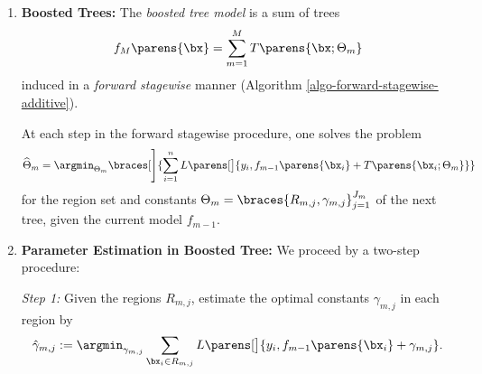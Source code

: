 \documentclass[12pt]{article}
\begin{document}
\begin{enumerate}[label=\textbf{\arabic*.}]
	\item \textbf{Boosted Trees:} The \textit{boosted tree model} is a sum of trees 
	\begin{align}\label{eq-tree-structure}
		f_M \parens{\bx} = \sum_{m=1}^M T \parens{\bx; \Theta_m} 
	\end{align}
	induced in a \emph{forward stagewise} manner (Algorithm \ref{algo-forward-stagewise-additive}). 
	
	At each step in the forward stagewise procedure, one solves the problem 
	\begin{align}\label{boosted.tree}
		\widehat{\Theta}_m = \argmin_{\Theta_m} \braces[\Bigg]{\sum_{i=1}^n L \parens[\big]{y_i, f_{m-1} \parens{\bx_i} + T \parens{\bx_i; \Theta_m}}}
	\end{align}
	for the region set and constants $\Theta_m = \braces{R_{m, j}, \gamma_{m, j}}_{j=1}^{J_m}$ of the next tree, given the current model $f_{m-1}$. 
	
	\item \textbf{Parameter Estimation in Boosted Tree:} We proceed by a two-step procedure: 
	
	\textit{Step 1:} Given the regions $R_{m,j}$, estimate the optimal constants $\gamma_{m,j}$ in each region by 
	\begin{align*}
		\hat{\gamma}_{m,j} := \argmin_{\gamma_{m,j}} \sum_{\bx_i \in R_{m,j}} L \parens[\big]{y_i, f_{m-1} \parens{\bx_i} + \gamma_{m, j}}. 
	\end{align*}
	

\end{enumerate}
\end{document}
